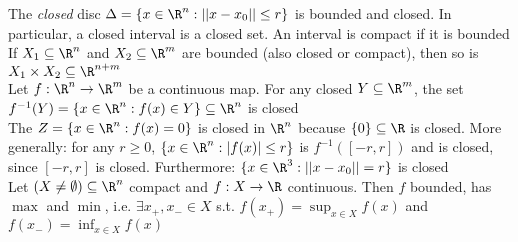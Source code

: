  The \textit{closed} disc $\Delta = \{ x \in \R^n : ||x - x_0|| \leq r \}$ is bounded and closed. In particular, a closed interval is a closed set.
An interval is compact if it is bounded
 If $X_1 \subseteq \R^n$ and $X_2 \subseteq \R^m$ are bounded (also closed or compact), then so is $X_1 \times X_2 \subseteq \R^{n + m}$\\
\shortproposition Let $f: \R^n \rightarrow \R^m$ be a continuous map. For any closed $Y \subseteq \R^m$,
the set $f^{-1}(Y) = \{ x \in \R^n : f(x) \in Y \} \subseteq \R^n$ is closed\\
\shortex The  $Z = \{ x\in \R^n : f(x) = 0 \}$ is closed in $\R^n$ because $\{ 0 \} \subseteq \R$ is closed.
More generally: for any $r \geq 0$, $\{ x \in \R^n : |f(x)| \leq r \}$ is $f^{-1}([-r, r])$ and is closed, since $[-r, r]$ is closed.
Furthermore: $\{ x\in \R^3 : ||x - x_0|| = r \}$ is closed\\
\shorttheorem Let $(X \neq \emptyset) \subseteq \R^n$ compact and $f: X \rightarrow \R$ continuous. 
Then $f$ bounded, has $\max$ and $\min$, i.e. $\exists x_+, x_- \in X$ s.t. $\displaystyle f(x_+) = \sup_{x \in X} f(x)$ and $\displaystyle f(x_-) = \inf_{x \in X} f(x)$
